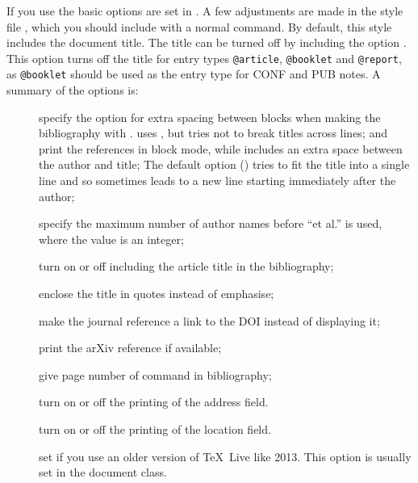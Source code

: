 \documentclass[UKenglish, texlive=2016]{\ATLASLATEXPATH atlasdoc}
\begin{document}
If you use  the basic options are set in .
A few adjustments are made in the style file ,
which you should include with a normal  command.
By default, this style includes the document title.
The title can be turned off by including the option .
This option turns off the title for entry types \texttt{@article}, \texttt{@booklet} and \texttt{@report},
as \texttt{@booklet} should be used as the entry type for CONF and PUB notes.
A summary of the options is:
\begin{description}
\item[] specify the option for extra spacing between blocks when making the bibliography with .
   uses , but tries not to break titles across lines;
   and  print the references in block mode, while  includes an extra space between the author and title;
  The default option () tries to fit the title into a single line
  and so sometimes leads to a new line starting immediately after the author;
\item[] specify the maximum number of author names before \enquote{et al.} is used, where the value is an integer;
\item[] turn on or off including the article title in the bibliography;
\item[] enclose the title in quotes instead of emphasise;
\item[] make the journal reference a link to the DOI instead of displaying it;
\item[] print the arXiv reference if available;
\item[] give page number of  command in bibliography;
\item[] turn on or off the printing of the address field.
\item[] turn on or off the printing of the location field.
\item[] set if you use an older version of \TeX\ Live like 2013.
  This option is usually set in the document class.
\end{description}
\end{document}
